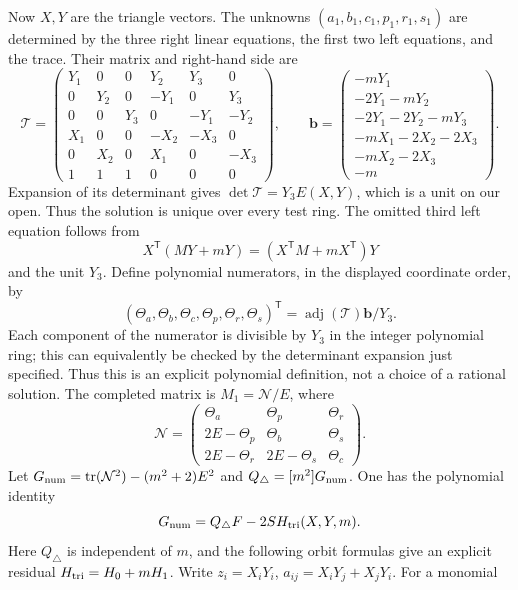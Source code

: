 \documentclass[11pt,a4paper]{article}
\theoremstyle{remark}\newtheorem{remark}[theorem]{Remark}
\begin{document}
Now \(X,Y\) are the triangle vectors. The unknowns
\((a_1,b_1,c_1,p_1,r_1,s_1)\) are determined by the three right
linear equations, the first two left equations, and the trace. Their matrix
and right-hand side are
\[
 \mathcal T=\begin{pmatrix}
 Y_1&0&0&Y_2&Y_3&0\\
 0&Y_2&0&-Y_1&0&Y_3\\
 0&0&Y_3&0&-Y_1&-Y_2\\
 X_1&0&0&-X_2&-X_3&0\\
 0&X_2&0&X_1&0&-X_3\\
 1&1&1&0&0&0
 \end{pmatrix},\qquad
 \mathbf b=\begin{pmatrix}
 -mY_1\\-2Y_1-mY_2\\-2Y_1-2Y_2-mY_3\\
 -mX_1-2X_2-2X_3\\-mX_2-2X_3\\-m
 \end{pmatrix}.
\]
Expansion of its determinant gives \(\det\mathcal T=Y_3E(X,Y)\),
which is a unit on our open. Thus the solution is unique over every test
ring. The omitted third left equation follows from
\[
 X^{\mathsf T}(MY+mY)=(X^{\mathsf T}M+mX^{\mathsf T})Y
\]
and the unit \(Y_3\).
Define polynomial numerators, in the displayed coordinate order, by
\[
 (\Theta_a,\Theta_b,\Theta_c,\Theta_p,\Theta_r,\Theta_s)^{\mathsf T}
       =\operatorname{adj}(\mathcal T)\mathbf b/Y_3.
\]
Each component of the numerator is divisible by \(Y_3\) in the integer
polynomial ring; this can equivalently be checked by the determinant
expansion just specified. Thus this is an explicit polynomial definition,
not a choice of a rational solution. The completed matrix is \(M_1=\mathcal N/E\),
where
\[
 \mathcal N=\begin{pmatrix}
 \Theta_a&\Theta_p&\Theta_r\\
 2E-\Theta_p&\Theta_b&\Theta_s\\
 2E-\Theta_r&2E-\Theta_s&\Theta_c
 \end{pmatrix}.
\]
Let \(G_{\rm num}=\operatorname{tr}(\mathcal N^2)-(m^2+2)E^2\) and
\(Q_\triangle=[m^2]G_{\rm num}\). One has the polynomial identity
\begin{equation}\label{geometry:trianglesyzygy}
 G_{\rm num}=Q_\triangle F-2S H_{\rm tri}(X,Y,m).
\end{equation}
Here \(Q_\triangle\) is independent of \(m\), and the following
orbit formulas give an explicit residual \(H_{\rm tri}=H_0+mH_1\).
Write \(z_i=X_iY_i\), \(a_{ij}=X_iY_j+X_jY_i\). For a monomial
\end{document}
